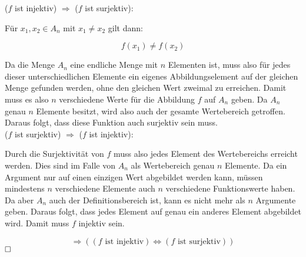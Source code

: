 \documentclass[11pt, a4paper]{article}
\begin{document}
		($f$ ist injektiv) $\Rightarrow$ ($f$ ist surjektiv):


		Für $x_1,x_2 \in A_n$ mit $x_1 \neq x_2$ gilt dann:
		
		\[ f(x_1) \neq f(x_2) \]

		Da die Menge $A_n$ eine endliche Menge mit $n$ Elementen ist, muss also für jedes dieser unterschiedlichen Elemente ein eigenes Abbildungselement auf der gleichen Menge gefunden werden, ohne den gleichen Wert zweimal zu erreichen. Damit muss es also $n$ verschiedene Werte für die Abbildung $f$ auf $A_n$ geben. Da $A_n$ genau $n$ Elemente besitzt, wird also auch der gesamte Wertebereich getroffen. Daraus folgt, dass diese Funktion auch surjektiv sein muss.\\



		($f$ ist surjektiv) $\Rightarrow$ ($f$ ist injektiv):

		Durch die Surjektivität von $f$ muss also jedes Element des Wertebereichs erreicht werden. Dies sind im Falle von $A_n$ als Wertebereich genau $n$ Elemente. Da ein Argument nur auf einen einzigen Wert abgebildet werden kann, müssen mindestens $n$ verschiedene Elemente auch $n$ verschiedene Funktionswerte haben. Da aber $A_n$ auch der Definitionsbereich ist, kann es nicht mehr als $n$ Argumente geben. Daraus folgt, dass jedes Element auf genau ein anderes Element abgebildet wird. Damit muss $f$ injektiv sein.

		\[ \Rightarrow ((f \text{ ist injektiv}) \Leftrightarrow (f \text{ ist surjektiv})) \] $\hfill \Box$
\end{document}

